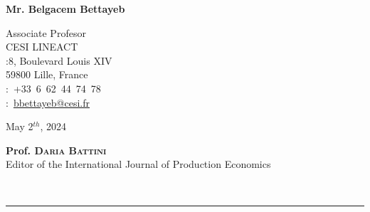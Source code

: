 \documentclass[a4,12pt]{article}
\begin{document}
	\sffamily
	\hfill
	
	\hfill    \begin{minipage}[t]{.5\textwidth}
		\raggedleft
		{\bfseries Mr. Belgacem Bettayeb}%
		
		\raggedleft
		\small
		Associate Profesor\\ 
  CESI LINEACT\\
		\Letter :8, Boulevard Louis XIV \\
                    59800 Lille, France\\ 
		\Telefon :~+33~6~62~44~74~78\\
		\Email :~\href{nbouaziz@cesi.fr}{bbettayeb@cesi.fr}
	\end{minipage}\normalsize
	
	\bigskip
	
	\begin{minipage}[t]{0.365\textwidth}
		\begin{flushleft}
			May 2$^{th}$, 2024 
		\end{flushleft} 
	\end{minipage}
	\bigskip
	
	\begin{minipage}[t]{.85\textwidth}
		\raggedright
		\small
        \textbf{Prof. \textsc{Daria Battini}} \\
		Editor of the International Journal of Production Economics\\
	\end{minipage}\\
	
	\hspace{-2.6cm}	\rule{1cm}{0.1mm}\\ \vspace{-1\baselineskip}
	
\end{document}
